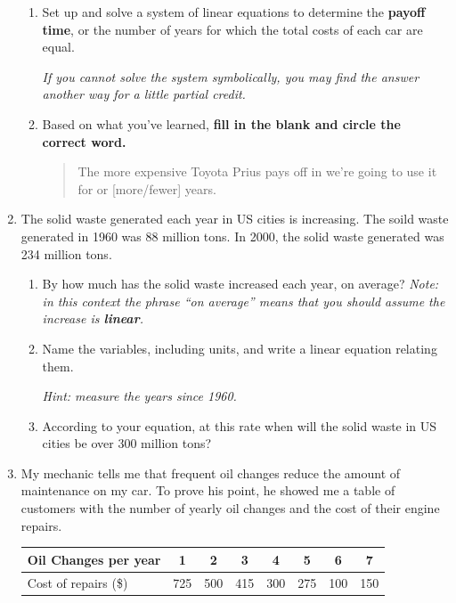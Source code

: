 \documentclass[12pt]{article}
\begin{document}
\begin{enumerate}
\begin{enumerate}
\item Set up and solve a system of linear equations to determine the \textbf{payoff time}, or the number of years for which the total costs of each car are equal.

\emph{If you cannot solve the system symbolically, you may find the answer another way for a little partial credit.}
\vfill

\item Based on what you've learned, \textbf{fill in the blank and circle the correct word.}

\begin{quote}
The more expensive Toyota Prius pays off in we're going to use it for \hrulefill   or [more/fewer] years.  
\end{quote}

\end{enumerate}




\newpage



\item The solid waste generated each year in US cities is increasing.  The soild waste generated in 1960 was 88 million tons. In 2000, the solid waste generated was 234 million tons.  

\begin{enumerate}
\item By how much has the solid waste increased each year, on average?  \emph{Note:  in this context the phrase ``on average'' means that you should assume the increase is \textbf{linear}.}
\vfill
\item Name the variables, including units, and write a linear equation relating them.

\emph{Hint:  measure the years since 1960.}
\vfill
\item According to your equation, at this rate when will the solid waste in US cities be over 300 million tons?
\vfill
\end{enumerate}

\newpage %
\item My mechanic tells me that frequent oil changes reduce the amount of maintenance on my car.  To prove his point, he showed me a table of customers with the number of yearly oil changes and the cost of their engine repairs.

\begin{center}
\begin{tabular} {|l|c|c |c|c|c|c|c|}  \hline
Oil Changes per year & 1 & 2 & 3 & 4 & 5 & 6 & 7  \\ \hline
Cost of repairs (\$) & 725 & 500 & 415 & 300 & 275 & 100 & 150  \\ \hline
\end{tabular}
\end{center}


\end{enumerate}
\end{document}

